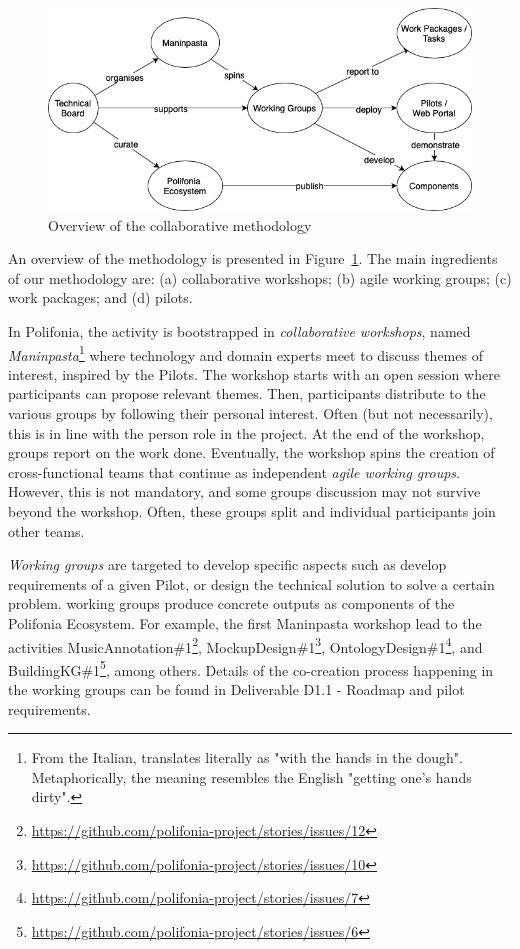 \begin{figure}
    \centering
    \includegraphics[width=1\textwidth]{images/Polifonia-D1.3-Methodology.png}
    \caption{Overview of the collaborative methodology}
    \label{fig:methodology}
\end{figure}
An overview of the methodology is presented in Figure~\ref{fig:methodology}.
The main ingredients of our methodology are: (a) collaborative workshops; (b) agile working groups; (c) work packages; and (d) pilots.

In Polifonia, the activity is bootstrapped in \textit{collaborative workshops}, named \textit{Maninpasta}\footnote{From the Italian, translates literally as "with the hands in the dough". Metaphorically, the meaning resembles the English "getting one's hands dirty".} where technology and domain experts meet to discuss themes of interest, inspired by the Pilots. 
The workshop starts with an open session where participants can propose relevant themes. 
Then, participants distribute to the various groups by following their personal interest.
Often (but not necessarily), this is in line with the person role in the project.
At the end of the workshop, groups report on the work done. 
Eventually, the workshop spins the creation of cross-functional teams that continue as independent \textit{agile working groups}. However, this is not mandatory, and some groups discussion may not survive beyond the workshop. Often, these groups split and individual participants join other teams.

\textit{Working groups} are targeted to develop specific aspects such as develop requirements of a given Pilot, or design the technical solution to solve a certain problem.
working groups produce concrete outputs as components of the Polifonia Ecosystem.
For example, the first Maninpasta workshop lead to the activities MusicAnnotation\#1\footnote{\url{https://github.com/polifonia-project/stories/issues/12}}, MockupDesign\#1\footnote{\url{https://github.com/polifonia-project/stories/issues/10}}, OntologyDesign\#1\footnote{\url{https://github.com/polifonia-project/stories/issues/7}}, and  BuildingKG\#1\footnote{\url{https://github.com/polifonia-project/stories/issues/6}}, among others.
Details of the co-creation process happening in the working groups can be found in Deliverable D1.1 - Roadmap and pilot requirements.

